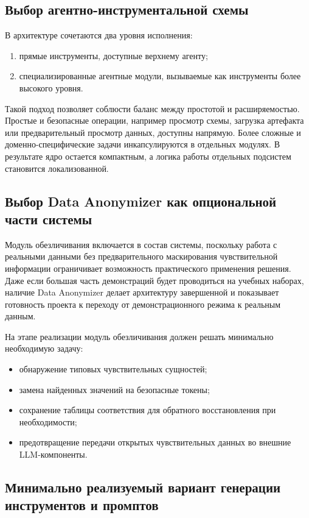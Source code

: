 \documentclass[14pt,a4paper]{extarticle}
\begin{document}
\subsection{Выбор агентно-инструментальной схемы}

В архитектуре сочетаются два уровня исполнения:
\begin{enumerate}
    \item прямые инструменты, доступные верхнему агенту;
    \item специализированные агентные модули, вызываемые как инструменты более высокого уровня.
\end{enumerate}

Такой подход позволяет соблюсти баланс между простотой и расширяемостью. Простые и безопасные операции, например просмотр схемы, загрузка артефакта или предварительный просмотр данных, доступны напрямую. Более сложные и доменно-специфические задачи инкапсулируются в отдельных модулях. В результате ядро остается компактным, а логика работы отдельных подсистем становится локализованной.

\subsection{Выбор Data Anonymizer как опциональной части системы}

Модуль обезличивания включается в состав системы, поскольку работа с реальными данными без предварительного маскирования чувствительной информации ограничивает возможность практического применения решения. Даже если большая часть демонстраций будет проводиться на учебных наборах, наличие Data Anonymizer делает архитектуру завершенной и показывает готовность проекта к переходу от демонстрационного режима к реальным данным.

На этапе реализации модуль обезличивания должен решать минимально необходимую задачу:
\begin{itemize}
    \item обнаружение типовых чувствительных сущностей;
    \item замена найденных значений на безопасные токены;
    \item сохранение таблицы соответствия для обратного восстановления при необходимости;
    \item предотвращение передачи открытых чувствительных данных во внешние LLM-компоненты.
\end{itemize}

\subsection{Минимально реализуемый вариант генерации инструментов и промптов}
\end{document}
